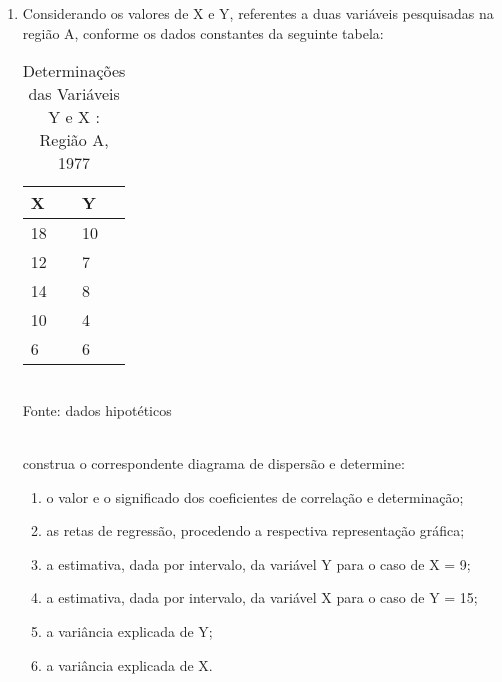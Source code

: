 \begin{enumerate}[resume]
\item Considerando os valores de X e Y, referentes a duas variáveis pesquisadas na região A, conforme os dados constantes da seguinte tabela:
	\begin{table}[!htb]
	\centering
	\caption{Determinações das Variáveis Y e X : Região A, 1977}
	\vspace{0.5cm}
	\begin{tabular}{ll}
	X & Y \\
	\hline 
	18 & 10  \\
	12 & 7  \\
	14 & 8  \\
	10 & 4  \\
	6 & 6  \\
	\end{tabular}\\
	Fonte: dados hipotéticos\\
	\end{table}\\	
	construa o correspondente diagrama de dispersão e determine:
	\begin{enumerate}
	\item o valor e o significado dos coeficientes de correlação e determinação;
	\item as retas de regressão, procedendo a respectiva representação gráfica;
	\item a estimativa, dada por intervalo, da variável Y para o caso de X = 9;
	\item	a estimativa, dada por intervalo, da variável X para o caso de Y = 15;
	\item a variância explicada de Y;	
	\item a variância explicada de X.
	\end{enumerate}


\end{enumerate}
